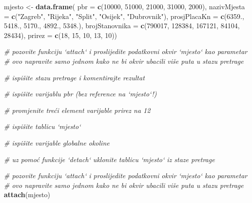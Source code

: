 \documentclass[]{book}
\newenvironment{Shaded}{\begin{snugshade}}{\end{snugshade}}
\newcommand{\KeywordTok}[1]{\textcolor[rgb]{0.13,0.29,0.53}{\textbf{#1}}}
\newcommand{\DataTypeTok}[1]{\textcolor[rgb]{0.13,0.29,0.53}{#1}}
\newcommand{\DecValTok}[1]{\textcolor[rgb]{0.00,0.00,0.81}{#1}}
\newcommand{\StringTok}[1]{\textcolor[rgb]{0.31,0.60,0.02}{#1}}
\newcommand{\CommentTok}[1]{\textcolor[rgb]{0.56,0.35,0.01}{\textit{#1}}}
\newcommand{\NormalTok}[1]{#1}
\theoremstyle{definition}
\theoremstyle{definition}
\theoremstyle{definition}
\theoremstyle{remark}
\begin{document}
\begin{Shaded}
\begin{Highlighting}[]
\NormalTok{mjesto <-}\StringTok{ }\KeywordTok{data.frame}\NormalTok{( }\DataTypeTok{pbr =} \KeywordTok{c}\NormalTok{(}\DecValTok{10000}\NormalTok{, }\DecValTok{51000}\NormalTok{, }\DecValTok{21000}\NormalTok{, }\DecValTok{31000}\NormalTok{, }\DecValTok{2000}\NormalTok{),}
         \DataTypeTok{nazivMjesta =} \KeywordTok{c}\NormalTok{(}\StringTok{"Zagreb"}\NormalTok{, }\StringTok{"Rijeka"}\NormalTok{, }\StringTok{"Split"}\NormalTok{, }\StringTok{"Osijek"}\NormalTok{, }\StringTok{"Dubrovnik"}\NormalTok{),}
         \DataTypeTok{prosjPlacaKn =} \KeywordTok{c}\NormalTok{(}\DecValTok{6359}\NormalTok{., }\DecValTok{5418}\NormalTok{., }\DecValTok{5170}\NormalTok{., }\DecValTok{4892}\NormalTok{., }\DecValTok{5348}\NormalTok{.),}
         \DataTypeTok{brojStanovnika =} \KeywordTok{c}\NormalTok{(}\DecValTok{790017}\NormalTok{, }\DecValTok{128384}\NormalTok{, }\DecValTok{167121}\NormalTok{, }\DecValTok{84104}\NormalTok{, }\DecValTok{28434}\NormalTok{),}
         \DataTypeTok{prirez =} \KeywordTok{c}\NormalTok{(}\DecValTok{18}\NormalTok{, }\DecValTok{15}\NormalTok{, }\DecValTok{10}\NormalTok{, }\DecValTok{13}\NormalTok{, }\DecValTok{10}\NormalTok{))}

\CommentTok{# pozovite funkciju `attach` i proslijedite podatkovni okvir `mjesto` kao parametar}
\CommentTok{# ovo napravite samo jednom kako ne bi okvir ubacili više puta u stazu pretrage}


\CommentTok{# ispišite stazu pretrage i komentirajte rezultat}


\CommentTok{# ispišite varijablu pbr (bez reference na `mjesto`!)}


\CommentTok{# promjenite treći element varijable prirez na 12}


\CommentTok{# ispišite tablicu `mjesto`}


\CommentTok{# ispišite varijable globalne okoline}


\CommentTok{# uz pomoć funkcije `detach` uklonite tablicu `mjesto` iz staze pretrage}
\end{Highlighting}
\end{Shaded}

\begin{Shaded}
\begin{Highlighting}[]
\CommentTok{# pozovite funkciju `attach` i proslijedite podatkovni okvir `mjesto` kao parametar}
\CommentTok{# ovo napravite samo jednom kako ne bi okvir ubacili više puta u stazu pretrage}
\KeywordTok{attach}\NormalTok{(mjesto)}
\end{Highlighting}
\end{Shaded}
\end{document}
